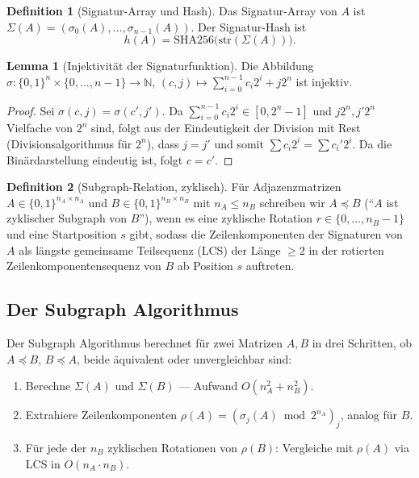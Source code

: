 \documentclass[a4paper,12pt]{article}
\theoremstyle{definition}
\newtheorem{definition}{Definition}
\newtheorem{lemma}{Lemma}
\begin{document}
\begin{definition}[Signatur-Array und Hash]
	Das Signatur-Array von $A$ ist $\Sigma(A) = (\sigma_0(A), \ldots, \sigma_{n-1}(A))$. Der Signatur-Hash ist
	\[
	h(A) = \mathrm{SHA256}\bigl(\mathrm{str}(\Sigma(A))\bigr).
	\]
\end{definition}

\begin{lemma}[Injektivität der Signaturfunktion]
	\label{lem:injektiv}
	Die Abbildung $\sigma: \{0,1\}^n \times \{0,\ldots,n-1\} \to \mathbb{N}$, $(c, j) \mapsto \sum_{i=0}^{n-1} c_i 2^i + j2^n$ ist injektiv.
\end{lemma}

\begin{proof}
	Sei $\sigma(c,j) = \sigma(c',j')$. Da $\sum_{i=0}^{n-1} c_i 2^i \in [0, 2^n-1]$ und $j2^n, j'2^n$ Vielfache von $2^n$ sind, folgt aus der Eindeutigkeit der Division mit Rest (Divisionsalgorithmus für $2^n$), dass $j = j'$ und somit $\sum c_i 2^i = \sum c_i' 2^i$. Da die Binärdarstellung eindeutig ist, folgt $c = c'$.
\end{proof}

\begin{definition}[Subgraph-Relation, zyklisch]
	Für Adjazenzmatrizen $A \in \{0,1\}^{n_A \times n_A}$ und $B \in \{0,1\}^{n_B \times n_B}$ mit $n_A \le n_B$ schreiben wir $A \preceq B$ (``$A$ ist zyklischer Subgraph von $B$''), wenn es eine zyklische Rotation $r \in \{0,\ldots,n_B-1\}$ und eine Startposition $s$ gibt, sodass die Zeilenkomponenten der Signaturen von $A$ als längste gemeinsame Teilsequenz (LCS) der Länge $\geq 2$ in der rotierten Zeilenkomponentensequenz von $B$ ab Position $s$ auftreten.
\end{definition}

\subsection{Der Subgraph Algorithmus}

Der Subgraph Algorithmus \cite{epp2026subgraph} berechnet für zwei Matrizen $A, B$ in drei Schritten, ob $A \preceq B$, $B \preceq A$, beide äquivalent oder unvergleichbar sind:

\begin{enumerate}
	\item Berechne $\Sigma(A)$ und $\Sigma(B)$ — Aufwand $O(n_A^2 + n_B^2)$.
	\item Extrahiere Zeilenkomponenten $\rho(A) = (\sigma_j(A) \bmod 2^{n_A})_j$, analog für $B$.
	\item Für jede der $n_B$ zyklischen Rotationen von $\rho(B)$: Vergleiche mit $\rho(A)$ via LCS in $O(n_A \cdot n_B)$.
\end{enumerate}
\end{document}
